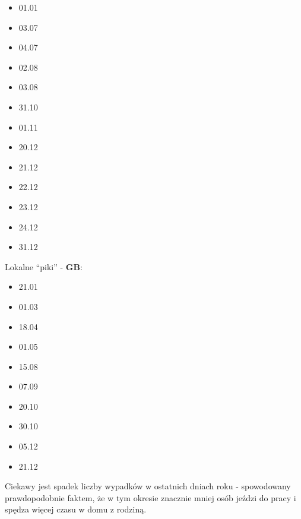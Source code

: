 \begin{itemize}
\itemsep-14pt\parskip0pt
\item
  01.01\\
\item
  03.07\\
\item
  04.07\\
\item
  02.08\\
\item
  03.08\\
\item
  31.10\\
\item
  01.11\\
\item
  20.12\\
\item
  21.12\\
\item
  22.12\\
\item
  23.12\\
\item
  24.12\\
\item
  31.12
\end{itemize}

Lokalne ``piki'' - \textbf{GB}:

\begin{itemize}
\itemsep-14pt\parskip0pt
\item
  21.01\\
\item
  01.03\\
\item
  18.04\\
\item
  01.05\\
\item
  15.08\\
\item
  07.09\\
\item
  20.10\\
\item
  30.10\\
\item
  05.12\\
\item
  21.12
\end{itemize}

Ciekawy jest spadek liczby wypadków w ostatnich dniach roku -
spowodowany prawdopodobnie faktem, że w tym okresie znacznie mniej osób
jeździ do pracy i spędza więcej czasu w domu z rodziną.

